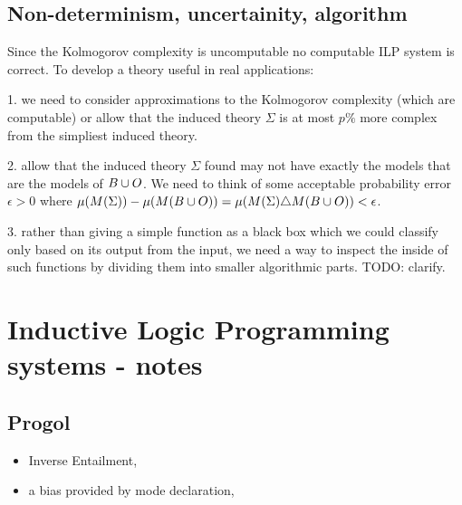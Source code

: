 \subsection{Non-determinism, uncertainity, algorithm}

Since the Kolmogorov complexity is uncomputable no computable ILP system is correct. To develop a theory useful in real applications:

1. we need to consider approximations to the Kolmogorov complexity (which are computable) or allow that the induced theory $\Sigma$ is at most $p\%$ more complex from the simpliest induced theory.

2. allow that the induced theory $\Sigma$ found may not have exactly the models that are the models of $B \cup O$. We need to think of some acceptable probability error $\epsilon>0$ where $\mu(M(\Sigma))-\mu(M(B \cup O)) = \mu(M(\Sigma)  \triangle  M(B \cup O)) < \epsilon$.

3. rather than giving a simple function as a black box which we could classify only based on its output from the input, we need a way to inspect the inside of such functions by dividing them into smaller algorithmic parts.
TODO: clarify.

\section{Inductive Logic Programming systems - notes}

\subsection{Progol}
\begin{itemize}
\item Inverse Entailment,
\item a bias provided by mode declaration,

\end{itemize}

